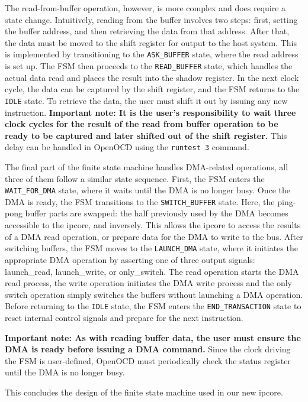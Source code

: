 \documentclass[a4paper,11pt,oneside]{report}
\begin{document}
The read-from-buffer operation, however, is more complex and does require a state change.
Intuitively, reading from the buffer involves two steps:
first, setting the buffer address, and then retrieving the data from that address.
After that, the data must be moved to the shift register for output to the host system.
This is implemented by transitioning to the \texttt{ASK\_BUFFER} state, where the read address is set up.
The FSM then proceeds to the \texttt{READ\_BUFFER} state, which handles the actual data read
and places the result into the shadow register.
In the next clock cycle, the data can be captured by the shift register, and the FSM returns to the \texttt{IDLE} state.
To retrieve the data, the user must shift it out by issuing any new instruction.
\textbf{Important note: It is the user's responsibility to wait three clock cycles for the result of the read from buffer operation
to be ready to be captured and later shifted out of the shift register.} This delay can be handled in OpenOCD using the \texttt{runtest 3} command.

The final part of the finite state machine handles DMA-related operations,
all three of them follow a similar state sequence.
First, the FSM enters the \texttt{WAIT\_FOR\_DMA} state, where it waits until the DMA is no longer busy.
Once the DMA is ready, the FSM transitions to the \texttt{SWITCH\_BUFFER} state.
Here, the ping-pong buffer parts are swapped: the half previously used by the DMA
becomes accessible to the ipcore, and inversely.
This allows the ipcore to access the results of a DMA read operation,
or prepare data for the DMA to write to the bus.
After switching buffers, the FSM moves to the \texttt{LAUNCH\_DMA} state,
where it initiates the appropriate DMA operation by asserting one of three output signals:
launch\_read, launch\_write, or only\_switch.
The read operation starts the DMA read process, the write operation
initiates the DMA write process and the only switch operation simply switches the buffers without launching a DMA operation.
Before returning to the \texttt{IDLE} state, the FSM enters the \texttt{END\_TRANSACTION} state
to reset internal control signals and prepare for the next instruction.

\textbf{Important note: As with reading buffer data, the user must ensure the DMA is ready before issuing a DMA command.}
Since the clock driving the FSM is user-defined, OpenOCD must periodically check the status register
until the DMA is no longer busy.

This concludes the design of the finite state machine used in our new ipcore.
\end{document}

